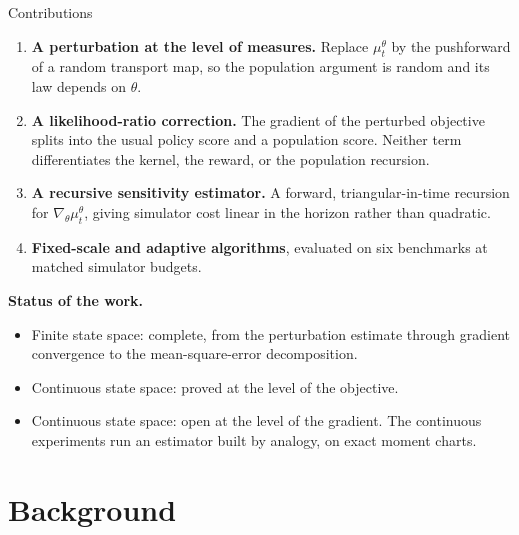 \documentclass[9pt]{beamer}
\newcommand{\good}[1]{\textcolor{Xgreen}{#1}}
\newcommand{\bad}[1]{\textcolor{Xred}{#1}}
\begin{document}
\begin{frame}{Contributions}
\small
\begin{enumerate}
  \item \textbf{A perturbation at the level of measures.} Replace $\mu_t^\theta$ by the pushforward of a random transport map, so the population argument is random and its law depends on $\theta$.
  \item \textbf{A likelihood-ratio correction.} The gradient of the perturbed objective splits into the usual policy score and a population score. Neither term differentiates the kernel, the reward, or the population recursion.
  \item \textbf{A recursive sensitivity estimator.} A forward, triangular-in-time recursion for $\nabla_\theta\mu_t^\theta$, giving simulator cost linear in the horizon rather than quadratic.
  \item \textbf{Fixed-scale and adaptive algorithms}, evaluated on six benchmarks at matched simulator budgets.
\end{enumerate}

\vspace{0.3cm}
\textbf{Status of the work.}
\begin{itemize}
  \item \good{Finite state space:} complete, from the perturbation estimate through gradient convergence to the mean-square-error decomposition.
  \item \good{Continuous state space:} proved at the level of the \good{objective}.
  \item \bad{Continuous state space:} \bad{open} at the level of the \bad{gradient}. The continuous experiments run an estimator built by analogy, on exact moment charts.
\end{itemize}

\end{frame}

\section{Background}
\end{document}
